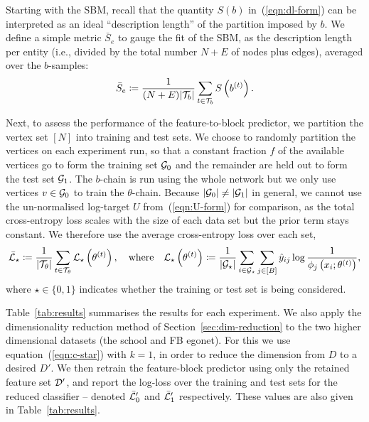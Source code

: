 Starting with the SBM, recall that the quantity $S(b)$ in~(\ref{eqn:dl-form}) 
can be interpreted as an ideal ``description length'' of the partition 
imposed by $b$. We define a simple
metric $\bar{S}_e$ to gauge the fit of the SBM,
as the description length per entity 
(i.e., divided by the total number $N+E$ of 
nodes plus edges),
averaged over the $b$-samples:
%
\begin{equation}
	\bar{S}_e \coloneqq \frac{1}{(N+E) |\mathcal{T}_b|} \sum_{t\in \mathcal{T}_b} S \left( b^{(t)} \right).
	\label{eqn:mean-dl}
\end{equation}
%

Next, to assess the performance of the feature-to-block predictor, 
we partition the vertex set $[N]$ into training and test sets. We choose to 
randomly partition the vertices on each experiment run,
so that a constant fraction $f$ of the available vertices go to form 
the training set $\mathcal{G}_0$ and the remainder are held out to form the
test set $\mathcal{G}_1$.
The $b$-chain is run using the whole network but we only use vertices $v \in \mathcal{G}_0$ to train the $\theta$-chain. Because $|\mathcal{G}_0| \neq |\mathcal{G}_1|$ in general, we cannot use the un-normalised log-target $U$ from~(\ref{eqn:U-form}) for comparison,
as the total cross-entropy loss scales with the size of each data set but 
the prior term stays constant. We therefore use the average cross-entropy loss 
over each set,
%
\begin{equation}
	\bar{\mathcal{L}}_\star \coloneqq \frac{1}{|\mathcal{T}_\theta|} \sum_{t \in \mathcal{T}_\theta} \mathcal{L}_\star \left( \theta^{(t)} \right),
	\quad \textrm{where} \quad
	\mathcal{L}_\star \left( \theta^{(t)} \right) \coloneqq \frac{1}{|\mathcal{G}_\star|} \sum_{i \in \mathcal{G}_\star}\sum_{j \in [B]} \hat{y}_{ij} \log \frac{1}{\phi_j \left(x_i; \theta^{(t)} \right)},
	\label{eqn:cross-entropy-loss}
\end{equation}
%
where $\star \in \{0, 1\}$ indicates whether the training or test
set is being considered.

Table~\ref{tab:results} summarises the results for each experiment. We also apply the 
dimensionality reduction method 
of Section~\ref{sec:dim-reduction}
to the two higher dimensional datasets (the school and FB egonet). 
For this we use equation~(\ref{eqn:c-star}) with $k=1$,
in order to reduce the dimension from 
$D$ to a desired $D'$. 
We then retrain the feature-block predictor using only the retained 
feature set $\mathcal{D}'$, and report the log-loss over the training and 
test sets for the reduced classifier -- 
denoted $\bar{\mathcal{L}}_0'$ and $\bar{\mathcal{L}}_1'$ respectively. 
These values are also given in Table~\ref{tab:results}.

